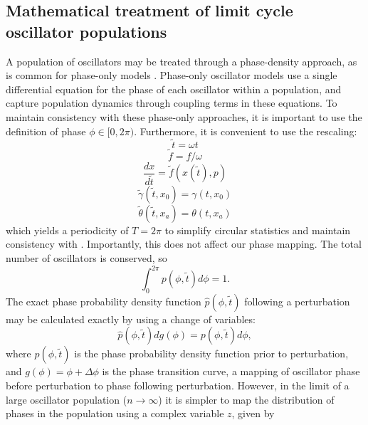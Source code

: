 \subsection*{Mathematical treatment of limit cycle oscillator populations\label{sec:35}}
A population of oscillators may be treated through a phase-density approach, as is common 
for phase-only models \cite{Ukai2007, StJohn2014b}.
Phase-only oscillator models use a single differential equation for the phase of each oscillator within a population,
and capture population dynamics through coupling terms in these equations.
To maintain consistency with these phase-only approaches, it is important to use the definition of phase $\phi\in[0,2\pi)$.
Furthermore, it is convenient to use the rescaling:
\begin{equation}
    \tilde{t} = \omega t
\end{equation}
\begin{equation}
    \tilde{f} = f/\omega
\end{equation}
\begin{equation}
    \frac{dx}{d\tilde{t}} = \tilde{f}(x(\tilde{t}), p)
\end{equation}
\begin{equation}
    \tilde{\gamma}(\tilde{t}, x_0) = \gamma(t,x_0)
\end{equation}
\begin{equation}
    \tilde{\theta}(\tilde{t}, x_a) = \theta(t,x_a)
\end{equation}
which yields a periodicity of $T=2\pi$ to simplify circular statistics and maintain consistency with \cite{StJohn2014b}.
Importantly, this does not affect our phase mapping.
The total number of oscillators is conserved, so
\begin{equation}
    \int_0^{2\pi} p(\phi,\tilde{t}) d\phi = 1.
\end{equation}
The exact phase probability density function $\hat{p}(\phi,\tilde{t})$ following a perturbation  may be calculated exactly by using a change of variables:
\begin{equation}
    \hat{p}(\phi,\tilde{t})dg(\phi) = p(\phi,\tilde{t})d\phi,
\end{equation}
where $p(\phi,\tilde{t})$ is the phase probability density function prior to perturbation, 
and $g(\phi) = \phi+\Delta\phi$ is the phase transition curve, a mapping of oscillator phase 
before perturbation to phase following perturbation.
However, in the limit of a large oscillator population ($n\to\infty$) it is simpler to map 
the distribution of phases in the population using a complex variable $z$, given by
